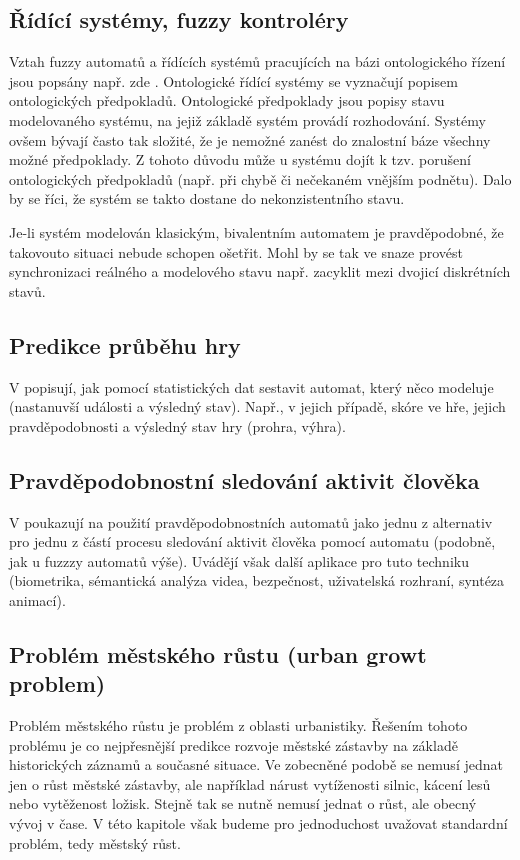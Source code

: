 \documentclass[a4paper,10pt]{article}
\begin{document}
\subsection{Řídící systémy, fuzzy kontroléry}
Vztah fuzzy automatů a řídících systémů pracujících na bázi ontologického řízení jsou popsány např. zde \cite{HeKinSep-DecMakFuzEnvZUsOntCon+}\cite{Gra+-ApFuStFuOuFinMaPrRecVioOntAss}\cite{GraFodDri-HybFuzBooAutOntCont}. Ontologické řídící systémy se vyznačují popisem ontologických předpokladů. Ontologické předpoklady jsou popisy stavu modelovaného systému, na jejiž základě systém provádí rozhodování. Systémy ovšem bývají často tak složité, že je nemožné zanést do znalostní báze všechny možné předpoklady. Z tohoto důvodu může u systému dojít k tzv. porušení ontologických předpokladů (např. při chybě či nečekaném vnějším podnětu). Dalo by se říci, že systém se takto dostane do nekonzistentního stavu.

Je-li systém modelován klasickým, bivalentním automatem  je pravděpodobné, že takovouto situaci nebude schopen ošetřit. Mohl by se tak ve snaze provést synchronizaci reálného a modelového stavu např. zacyklit mezi dvojicí diskrétních stavů.  



\subsection{Predikce průběhu hry}
V \cite{Hua+-LeaProbAutModChe} popisují, jak pomocí statistických dat sestavit automat, který něco modeluje (nastanuvší události a výsledný stav). Např., v jejich případě, skóre ve hře, jejich pravděpodobnosti a výsledný stav hry (prohra, výhra).

\subsection{Pravděpodobnostní sledování aktivit člověka}
V \cite{TurChe-MacRecHumActSur} poukazují na použití pravděpodobnostních automatů jako jednu z alternativ pro jednu z částí procesu sledování aktivit člověka pomocí automatu (podobně, jak u fuzzzy automatů výše). Uvádějí však další aplikace pro tuto techniku (biometrika, sémantická analýza videa, bezpečnost, uživatelská rozhraní, syntéza animací). 
\subsection{Problém městského růstu (urban growt problem)}
Problém městského růstu je problém z oblasti urbanistiky. Řešením tohoto problému je co nejpřesnější predikce rozvoje městské zástavby na základě historických záznamů a současné situace. Ve zobecněné podobě se nemusí jednat jen o růst městské zástavby, ale například nárust vytíženosti silnic, kácení lesů nebo vytěženost ložisk. Stejně tak se nutně nemusí jednat o růst, ale obecný vývoj v čase. V této kapitole však budeme pro jednoduchost uvažovat standardní problém, tedy městský růst.
\end{document}
